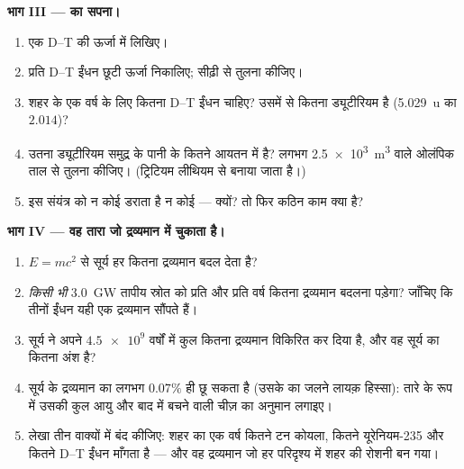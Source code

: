 \begin{problem}
\medskip
\noindent\textbf{भाग III ---  का सपना।}
\begin{enumerate}[resume]
  \item एक D--T  की ऊर्जा  में लिखिए।
  \item प्रति  D--T ईंधन छूटी ऊर्जा निकालिए; सीढ़ी
        से तुलना कीजिए।
  \item शहर के एक वर्ष के लिए कितना D--T ईंधन चाहिए? उसमें से कितना
        ड्यूटीरियम है (\qty{5.029}{u} का $2.014$)?
  \item उतना ड्यूटीरियम समुद्र के पानी के कितने आयतन में है? लगभग \qty{2.5e3}{m^3}
        वाले ओलंपिक ताल से तुलना कीजिए। (ट्रिटियम लीथियम से बनाया जाता है।)
  \item इस संयंत्र को न कोई  डराता है न कोई
         --- क्यों? तो फिर कठिन काम क्या है?
\end{enumerate}

\medskip
\noindent\textbf{भाग IV --- वह तारा जो द्रव्यमान में चुकाता है।}
\begin{enumerate}[resume]
  \item $E = mc^2$ से सूर्य हर  कितना द्रव्यमान बदल देता है?
  \item \emph{किसी भी} \qty{3.0}{GW} तापीय स्रोत को प्रति  और प्रति वर्ष
        कितना द्रव्यमान बदलना पड़ेगा? जाँचिए कि तीनों ईंधन यही एक द्रव्यमान
        सौंपते हैं।
  \item सूर्य ने अपने $\num{4.5e9}$ वर्षों में कुल कितना द्रव्यमान विकिरित कर दिया
        है, और वह सूर्य का कितना अंश है?
  \item {} सूर्य के द्रव्यमान का लगभग $0.07\%$ ही छू सकता है (उसके
         का जलने लायक़ हिस्सा): तारे के रूप में उसकी कुल आयु और बाद में
        बचने वाली चीज़ का अनुमान लगाइए।
  \item लेखा तीन वाक्यों में बंद कीजिए: शहर का एक वर्ष कितने टन कोयला, कितने
         यूरेनियम-235 और कितने  D--T ईंधन
        माँगता है --- और वह  द्रव्यमान जो हर परिदृश्य में
        शहर की रोशनी बन गया।
\end{enumerate}
\end{problem}
